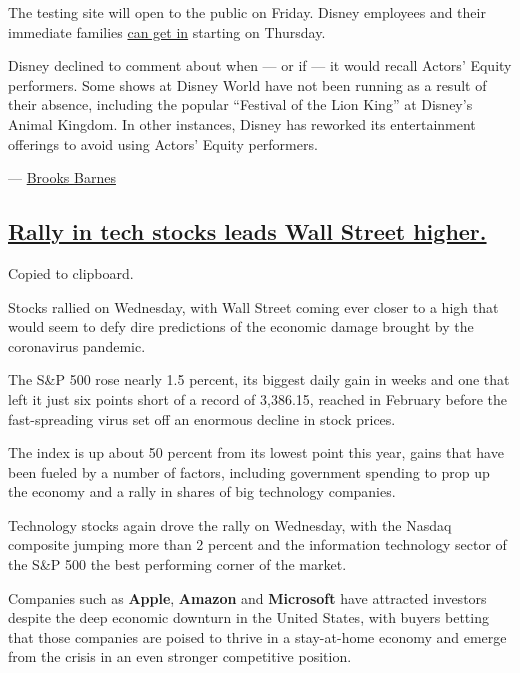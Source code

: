 The testing site will open to the public on Friday. Disney employees and
their immediate families \href{https://disneycovid19test.com/}{can get
in} starting on Thursday.

Disney declined to comment about when --- or if --- it would recall
Actors' Equity performers. Some shows at Disney World have not been
running as a result of their absence, including the popular ``Festival
of the Lion King'' at Disney's Animal Kingdom. In other instances,
Disney has reworked its entertainment offerings to avoid using Actors'
Equity performers.

--- \href{https://www.nytimes3xbfgragh.onion/by/brooks-barnes}{Brooks
Barnes}

\hypertarget{rally-in-tech-stocks-leads-wall-street-higher}{%
\subsection{\texorpdfstring{\protect\hyperlink{rally-in-tech-stocks-leads-wall-street-higher}{Rally
in tech stocks leads Wall Street
higher.}}{Rally in tech stocks leads Wall Street higher.}}\label{rally-in-tech-stocks-leads-wall-street-higher}}

Copied to clipboard.

Stocks rallied on Wednesday, with Wall Street coming ever closer to a
high that would seem to defy dire predictions of the economic damage
brought by the coronavirus pandemic.

The S\&P 500 rose nearly 1.5 percent, its biggest daily gain in weeks
and one that left it just six points short of a record of 3,386.15,
reached in February before the fast-spreading virus set off an enormous
decline in stock prices.

The index is up about 50 percent from its lowest point this year, gains
that have been fueled by a number of factors, including government
spending to prop up the economy and a rally in shares of big technology
companies.

Technology stocks again drove the rally on Wednesday, with the Nasdaq
composite jumping more than 2 percent and the information technology
sector of the S\&P 500 the best performing corner of the market.

Companies such as \textbf{Apple}, \textbf{Amazon} and \textbf{Microsoft}
have attracted investors despite the deep economic downturn in the
United States, with buyers betting that those companies are poised to
thrive in a stay-at-home economy and emerge from the crisis in an even
stronger competitive position.

